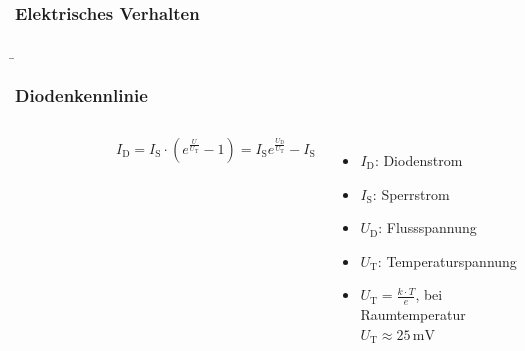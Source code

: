 \subsubsection{Elektrisches Verhalten}
\begin{frame}
    \b{
        \frametitle{Diodenkennlinie}
        \begin{columns}
            \begin{figure}[H]
                \centering
                
            \end{figure}

            $I_\mathrm{D} = I_\mathrm{S} \cdot (e^{\frac{U}{U_\mathrm{T}}} - 1) = I_\mathrm{S}  e^{\frac{U_\mathrm{D}}{U_\mathrm{T}}} - I_\mathrm{S}$
            \begin{itemize}
                \item $I_\mathrm{D}$: Diodenstrom
                \item $I_\mathrm{S}$: Sperrstrom
                \item $U_\mathrm{D}$: Flussspannung
                \item $U_\mathrm{T}$: Temperaturspannung
                \item $U_\mathrm{T} = \frac{k \cdot T}{e}$, bei Raumtemperatur $U_\mathrm{T} \approx 25\,\mathrm{mV}$
            \end{itemize}
        \end{columns}}

\end{frame}

